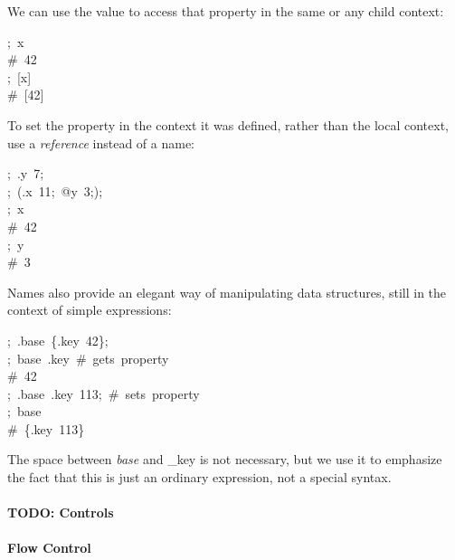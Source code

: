 \documentclass[preprint]{{acmart}}
\begin{document}
We can use the value  to access that property in the same or any child context:%
\begin{mdpre}%
\noindent;~x\\
{\#~42}\\
;~{}[x]\\
{\#~{}[42]}%
\end{mdpre}\noindent{}To set the property in the context it was defined, rather than the local context,
use a \emph{reference} instead of a name:
\begin{mdpre}%
\noindent;~.y~7;\\
;~(.x~{11};~{@y}~3;);\\
;~x\\
{\#~42}\\
;~y\\
{\#~3}%
\end{mdpre}\noindent{}Names also provide an elegant way of manipulating data structures, still
in the context of simple expressions:
\begin{mdpre}%
\noindent;~.base~\{.key~{42}\};\\
;~base~.key~{\#~gets~property}\\
{\#~42}\\
;~.base~.key~{113};~{\#~sets~property}\\
;~base\\
{\#~\{.key~113\}}%
\end{mdpre}\noindent{}The space between \emph{base} and \_key is not necessary, but we use it to
emphasize the fact that this is just an ordinary expression, not a
special syntax.

\paragraph{TODO: Controls}\label{sec-todo--controls}%

\paragraph{Flow Control}\label{sec-flow-control}%
\end{document}
